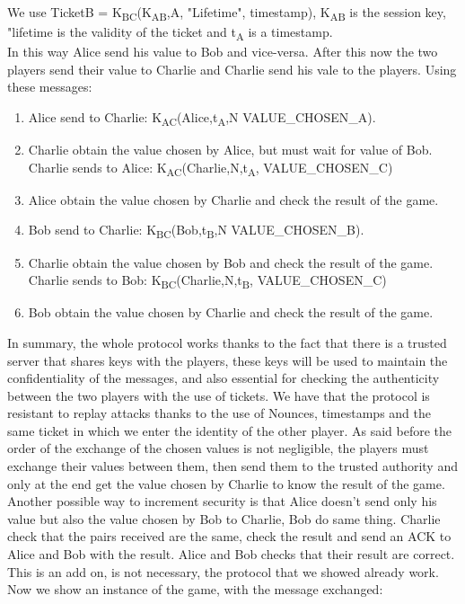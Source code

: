 \documentclass{article}
\begin{document}
We use TicketB = K\textsubscript{BC}(K\textsubscript{AB},A, "Lifetime", timestamp), K\textsubscript{AB} is the session key, "lifetime is the validity of the ticket and t\textsubscript{A} is a timestamp.\\In this way Alice send his value to Bob and vice-versa. After this now the two players send their value to Charlie and Charlie send his vale to the players. Using these messages:\\
\begin{enumerate}
   \item Alice send to Charlie: K\textsubscript{AC}(Alice,t\textsubscript{A},N VALUE\_CHOSEN\_A).
   \item Charlie obtain the value chosen by Alice, but must wait for value of Bob. Charlie sends to Alice: K\textsubscript{AC}(Charlie,N,t\textsubscript{A}, VALUE\_CHOSEN\_C)
   \item Alice obtain the value chosen by Charlie and check the result of the game.
   \item Bob send to Charlie: K\textsubscript{BC}(Bob,t\textsubscript{B},N VALUE\_CHOSEN\_B).
   \item Charlie obtain the value chosen by Bob and check the result of the game. Charlie sends to Bob: K\textsubscript{BC}(Charlie,N,t\textsubscript{B}, VALUE\_CHOSEN\_C)
   \item Bob obtain the value chosen by Charlie and check the result of the game.
\end{enumerate}
In summary, the whole protocol works thanks to the fact that there is a trusted server that shares keys with the players, these keys will be used to maintain the confidentiality of the messages, and also essential for checking the authenticity between the two players with the use of tickets. We have that the protocol is resistant to replay attacks thanks to the use of Nounces, timestamps and the same ticket in which we enter the identity of the other player. As said before the order of the exchange of the chosen values is not negligible, the players must exchange their values between them, then send them to the trusted authority and only at the end get the value chosen by Charlie to know the result of the game.\\ Another possible way to increment security is that Alice doesn't send only his value but also the value chosen by Bob to Charlie, Bob do same thing. Charlie check that the pairs received are the same, check the result and send an ACK to Alice and Bob with the result. Alice and Bob checks that their result are correct. This is an add on, is not necessary, the protocol that we showed already work.\\Now we show an instance of the game, with the message exchanged:\\
\end{document}
